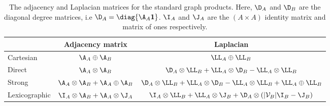 \begin{table}[h]
    \def\arraystretch{1.8}
    \centering
    \small
    \vspace{0.5cm}
    \begin{tabular}{|l|cc|}
        \hline

         & Adjacency matrix
         & Laplacian                                                                              \\

        \hline

        Cartesian
         & $\A_A \oplus \A_B$
         & $\LL_A \oplus \LL_B$                                                                   \\

        Direct
         & $\A_A \otimes \A_B$
         & $\D_A \otimes \LL_B + \LL_A \otimes \D_B - \LL_A \otimes \LL_B$                        \\

        Strong
         & $\A_A \otimes \A_B + \A_A \oplus \A_B$
         & $\D_A \otimes \LL_B + \LL_A \otimes \D_B - \LL_A \otimes \LL_B + \LL_A \oplus \LL_B$   \\

        Lexicographic
         & $\I_A \otimes \A_B + \A_A \otimes \J_A$
         & $\I_A \otimes \LL_B + \LL_A \otimes \J_B + \D_A \otimes (|\mathcal{V}_B| \I_B - \J_B)$ \\

        \hline
    \end{tabular}
    \vspace{0.2cm}
    \caption[The adjacency and Laplacian matrices for the standard graph products]{The adjacency and Laplacian matrices for the standard graph products. Here, $\D_A$ and $\D_B$ are the diagonal degree matrices, i.e $\D_A = \diag{\A_A \mathbf{1}}$. $\I_A$ and $\J_A$ are the $(A \times A)$ identity matrix and matrix of ones respectively. }
    \vspace{0.3cm}
    \label{tab:grap_product_matrices}
\end{table}

